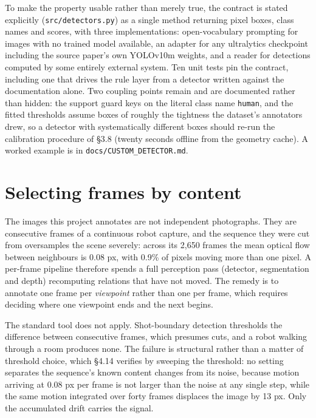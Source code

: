 To make the property usable rather than merely true, the contract is stated explicitly (\texttt{src/detectors.py}) as a single method returning pixel boxes, class names and scores, with three implementations: open-vocabulary prompting for images with no trained model available, an adapter for any ultralytics checkpoint including the source paper's own YOLOv10m weights, and a reader for detections computed by some entirely external system. Ten unit tests pin the contract, including one that drives the rule layer from a detector written against the documentation alone. Two coupling points remain and are documented rather than hidden: the support guard keys on the literal class name \texttt{human}, and the fitted thresholds assume boxes of roughly the tightness the dataset's annotators drew, so a detector with systematically different boxes should re-run the calibration procedure of \S3.8 (twenty seconds offline from the geometry cache). A worked example is in \texttt{docs/CUSTOM\_DETECTOR.md}.

\section{Selecting frames by content}

The images this project annotates are not independent photographs. They are consecutive frames of a continuous robot capture, and the sequence they were cut from oversamples the scene severely: across its 2,650 frames the mean optical flow between neighbours is 0.08 px, with 0.9\% of pixels moving more than one pixel. A per-frame pipeline therefore spends a full perception pass (detector, segmentation and depth) recomputing relations that have not moved. The remedy is to annotate one frame per \textit{viewpoint} rather than one per frame, which requires deciding where one viewpoint ends and the next begins.

The standard tool does not apply. Shot-boundary detection thresholds the difference between consecutive frames, which presumes cuts, and a robot walking through a room produces none. The failure is structural rather than a matter of threshold choice, which \S4.14 verifies by sweeping the threshold: no setting separates the sequence's known content changes from its noise, because motion arriving at 0.08 px per frame is not larger than the noise at any single step, while the same motion integrated over forty frames displaces the image by 13 px. Only the accumulated drift carries the signal.

